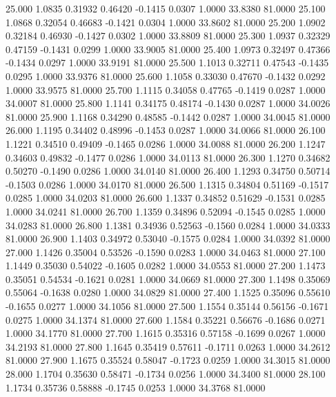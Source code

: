   25.000   1.0835   0.31932   0.46420  -0.1415   0.0307   1.0000  33.8380  81.0000
  25.100   1.0868   0.32054   0.46683  -0.1421   0.0304   1.0000  33.8602  81.0000
  25.200   1.0902   0.32184   0.46930  -0.1427   0.0302   1.0000  33.8809  81.0000
  25.300   1.0937   0.32329   0.47159  -0.1431   0.0299   1.0000  33.9005  81.0000
  25.400   1.0973   0.32497   0.47366  -0.1434   0.0297   1.0000  33.9191  81.0000
  25.500   1.1013   0.32711   0.47543  -0.1435   0.0295   1.0000  33.9376  81.0000
  25.600   1.1058   0.33030   0.47670  -0.1432   0.0292   1.0000  33.9575  81.0000
  25.700   1.1115   0.34058   0.47765  -0.1419   0.0287   1.0000  34.0007  81.0000
  25.800   1.1141   0.34175   0.48174  -0.1430   0.0287   1.0000  34.0026  81.0000
  25.900   1.1168   0.34290   0.48585  -0.1442   0.0287   1.0000  34.0045  81.0000
  26.000   1.1195   0.34402   0.48996  -0.1453   0.0287   1.0000  34.0066  81.0000
  26.100   1.1221   0.34510   0.49409  -0.1465   0.0286   1.0000  34.0088  81.0000
  26.200   1.1247   0.34603   0.49832  -0.1477   0.0286   1.0000  34.0113  81.0000
  26.300   1.1270   0.34682   0.50270  -0.1490   0.0286   1.0000  34.0140  81.0000
  26.400   1.1293   0.34750   0.50714  -0.1503   0.0286   1.0000  34.0170  81.0000
  26.500   1.1315   0.34804   0.51169  -0.1517   0.0285   1.0000  34.0203  81.0000
  26.600   1.1337   0.34852   0.51629  -0.1531   0.0285   1.0000  34.0241  81.0000
  26.700   1.1359   0.34896   0.52094  -0.1545   0.0285   1.0000  34.0283  81.0000
  26.800   1.1381   0.34936   0.52563  -0.1560   0.0284   1.0000  34.0333  81.0000
  26.900   1.1403   0.34972   0.53040  -0.1575   0.0284   1.0000  34.0392  81.0000
  27.000   1.1426   0.35004   0.53526  -0.1590   0.0283   1.0000  34.0463  81.0000
  27.100   1.1449   0.35030   0.54022  -0.1605   0.0282   1.0000  34.0553  81.0000
  27.200   1.1473   0.35051   0.54534  -0.1621   0.0281   1.0000  34.0669  81.0000
  27.300   1.1498   0.35069   0.55064  -0.1638   0.0280   1.0000  34.0829  81.0000
  27.400   1.1525   0.35096   0.55610  -0.1655   0.0277   1.0000  34.1056  81.0000
  27.500   1.1554   0.35144   0.56156  -0.1671   0.0275   1.0000  34.1374  81.0000
  27.600   1.1584   0.35221   0.56676  -0.1686   0.0271   1.0000  34.1770  81.0000
  27.700   1.1615   0.35316   0.57158  -0.1699   0.0267   1.0000  34.2193  81.0000
  27.800   1.1645   0.35419   0.57611  -0.1711   0.0263   1.0000  34.2612  81.0000
  27.900   1.1675   0.35524   0.58047  -0.1723   0.0259   1.0000  34.3015  81.0000
  28.000   1.1704   0.35630   0.58471  -0.1734   0.0256   1.0000  34.3400  81.0000
  28.100   1.1734   0.35736   0.58888  -0.1745   0.0253   1.0000  34.3768  81.0000
